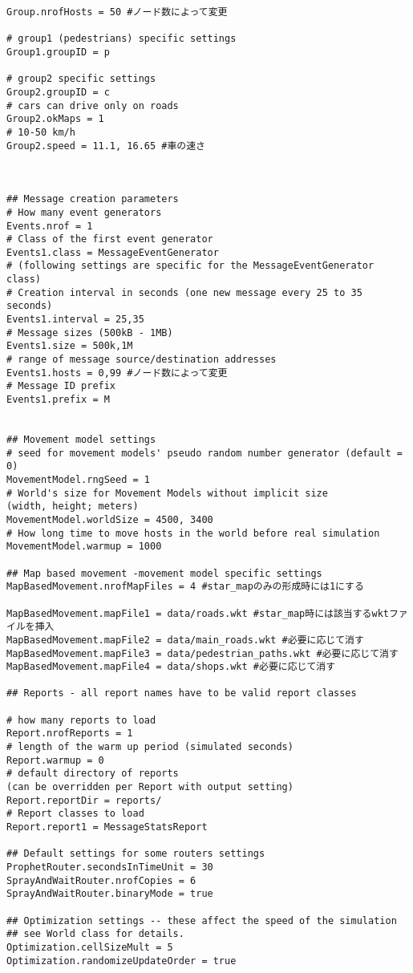 \documentclass[11pt]{icsthesis}
\begin{document}
\begin{framed}
\begin{verbatim}
Group.nrofHosts = 50 #ノード数によって変更

# group1 (pedestrians) specific settings
Group1.groupID = p

# group2 specific settings
Group2.groupID = c
# cars can drive only on roads
Group2.okMaps = 1
# 10-50 km/h
Group2.speed = 11.1, 16.65 #車の速さ



## Message creation parameters 
# How many event generators
Events.nrof = 1
# Class of the first event generator
Events1.class = MessageEventGenerator
# (following settings are specific for the MessageEventGenerator class)
# Creation interval in seconds (one new message every 25 to 35 seconds)
Events1.interval = 25,35
# Message sizes (500kB - 1MB)
Events1.size = 500k,1M
# range of message source/destination addresses
Events1.hosts = 0,99 #ノード数によって変更
# Message ID prefix
Events1.prefix = M


## Movement model settings
# seed for movement models' pseudo random number generator (default = 0)
MovementModel.rngSeed = 1
# World's size for Movement Models without implicit size 
(width, height; meters)
MovementModel.worldSize = 4500, 3400
# How long time to move hosts in the world before real simulation
MovementModel.warmup = 1000

## Map based movement -movement model specific settings
MapBasedMovement.nrofMapFiles = 4 #star_mapのみの形成時には1にする

MapBasedMovement.mapFile1 = data/roads.wkt #star_map時には該当するwktファイルを挿入
MapBasedMovement.mapFile2 = data/main_roads.wkt #必要に応じて消す
MapBasedMovement.mapFile3 = data/pedestrian_paths.wkt #必要に応じて消す
MapBasedMovement.mapFile4 = data/shops.wkt #必要に応じて消す

## Reports - all report names have to be valid report classes

# how many reports to load
Report.nrofReports = 1
# length of the warm up period (simulated seconds)
Report.warmup = 0
# default directory of reports 
(can be overridden per Report with output setting)
Report.reportDir = reports/
# Report classes to load
Report.report1 = MessageStatsReport

## Default settings for some routers settings
ProphetRouter.secondsInTimeUnit = 30
SprayAndWaitRouter.nrofCopies = 6
SprayAndWaitRouter.binaryMode = true

## Optimization settings -- these affect the speed of the simulation
## see World class for details.
Optimization.cellSizeMult = 5
Optimization.randomizeUpdateOrder = true



\end{verbatim}
\end{framed}
\end{document}
